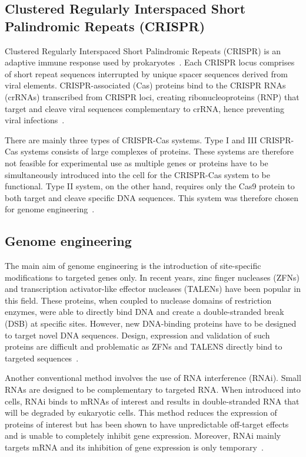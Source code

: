 \documentclass[11pt]{article}
\begin{document}
\subsection{Clustered Regularly Interspaced Short Palindromic Repeats (CRISPR)}
Clustered Regularly Interspaced Short Palindromic Repeats (CRISPR) is an adaptive immune response used by prokaryotes~\citep{Sorek2013}.  Each CRISPR locus comprises of short repeat sequences interrupted by unique spacer sequences derived from viral elements. CRISPR-associated (Cas) proteins bind to the CRISPR RNAs (crRNAs) transcribed from CRISPR loci, creating ribonucleoproteins (RNP) that target and cleave viral sequences complementary to crRNA, hence preventing viral infections~\citep{Jiang2015, Sternberg2015}. 

There are mainly three types of CRISPR-Cas systems. Type I and III CRISPR-Cas systems consists of large complexes of proteins. These systems are therefore not feasible for experimental use as multiple genes or proteins have to be simultaneously introduced into the cell for the CRISPR-Cas system to be functional. Type II system, on the other hand, requires only the Cas9 protein to both target and cleave specific DNA sequences. This system was therefore chosen for genome engineering~\citep{Doudna2014, Jinek2012a}.

\subsection{Genome engineering}
The main aim of genome engineering is the introduction of site-specific modifications to targeted genes only. In recent years, zinc finger nucleases (ZFNs) and transcription activator-like effector nucleases (TALENs) have been popular in this field. These proteins, when coupled to nuclease domains of restriction enzymes, were able to directly bind DNA and create a double-stranded break (DSB) at specific sites. However, new DNA-binding proteins have to be designed to target novel DNA sequences. Design, expression and validation of such proteins are difficult and problematic as ZFNs and TALENS directly bind to targeted sequences~\citep{Doudna2014}.

Another conventional method involves the use of RNA interference (RNAi). Small RNAs are designed to be complementary to targeted RNA. When introduced into cells, RNAi binds to mRNAs of interest and results in double-stranded RNA that will be degraded by eukaryotic cells. This method reduces the expression of proteins of interest but has been shown to have unpredictable off-target effects and is unable to completely inhibit gene expression. Moreover, RNAi mainly targets mRNA and its inhibition of gene expression is only temporary~\citep{Gilles2014a}.
\end{document}
